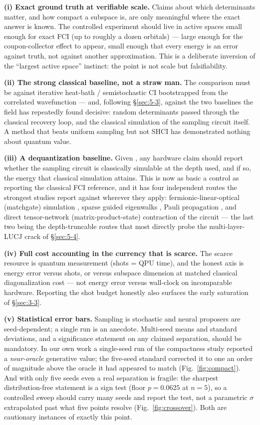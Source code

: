 \documentclass[11pt]{article}
\begin{document}
\textbf{(i) Exact ground truth at verifiable scale.} Claims about which determinants matter, and how compact a subspace is, are only meaningful where the exact answer is known. The controlled experiment should live in active spaces small enough for exact FCI (up to roughly a dozen orbitals) --- large enough for the coupon-collector effect to appear, small enough that every energy is an error against truth, not against another approximation. This is a deliberate inversion of the ``largest active space'' instinct: the point is not scale but falsifiability.

\textbf{(ii) The strong classical baseline, not a straw man.} The comparison must be against iterative heat-bath / semistochastic CI bootstrapped from the correlated wavefunction --- and, following \S\ref{sec:5-3}, against the two baselines the field has repeatedly found decisive: random determinants passed through the classical recovery loop, and the classical simulation of the sampling circuit itself. A method that beats uniform sampling but not SHCI has demonstrated nothing about quantum value.

\textbf{(iii) A dequantization baseline.} Given \cite{belagali2026}, any hardware claim should report whether the sampling circuit is classically simulable at the depth used, and if so, the energy that classical simulation attains. This is now as basic a control as reporting the classical FCI reference, and it has four independent routes the strongest studies report against wherever they apply: fermionic-linear-optical (matchgate) simulation \cite{belagali2026,hassman2025}, sparse guided eigenwalks \cite{chin2026}, Pauli propagation \cite{shrikhande2025}, and direct tensor-network (matrix-product-state) contraction of the circuit --- the last two being the depth-truncable routes that most directly probe the multi-layer-LUCJ crack of \S\ref{sec:5-4}.

\textbf{(iv) Full cost accounting in the currency that is scarce.} The scarce resource is quantum measurement (shots = QPU time), and the honest axis is energy error versus shots, or versus subspace dimension at matched classical diagonalization cost --- not energy error versus wall-clock on incomparable hardware. Reporting the shot budget honestly also surfaces the early saturation of \S\ref{sec:3-3}.

\textbf{(v) Statistical error bars.} Sampling is stochastic and neural proposers are seed-dependent; a single run is an anecdote. Multi-seed means and standard deviations, and a significance statement on any claimed separation, should be mandatory. In our own work a single-seed run of the compactness study reported a \emph{near-oracle} generative value; the five-seed standard corrected it to one an order of magnitude above the oracle it had appeared to match (Fig.~\ref{fig:compact}). And with only five seeds even a real separation is fragile: the sharpest distribution-free statement is a sign test (floor $p{=}0.0625$ at $n{=}5$), so a controlled sweep should carry many seeds and report the test, not a parametric $\sigma$ extrapolated past what five points resolve (Fig.~\ref{fig:crossover}). Both are cautionary instances of exactly this point.
\end{document}
